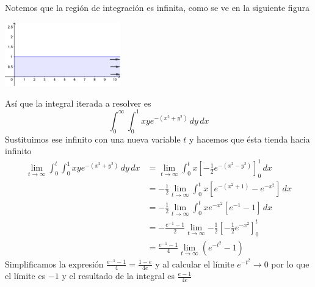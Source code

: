 \documentclass{article}
\begin{document}
\begin{enumerate}
{            \color{azul}
            Notemos que la región de integración es infinita, como se ve en la
            siguiente figura
            \begin{center}
                \includegraphics[width=5cm]{img/ej8.png}
            \end{center}
            Así que la integral iterada a resolver es
            \[
                \int_{0}^{\infty}{
                    \int_{0}^{1}{
                        xye^{-(x^2+y^2)}
                    \,dy}
                \,dx}
            \]
            Sustituimos ese infinito con una nueva variable $t$ y hacemos que
            ésta tienda hacia infinito
            \begin{align*}
                \lim_{t\to\infty}{
                    \int_{0}^{t}{
                        \int_{0}^{1}{
                            xye^{-(x^2+y^2)}
                        \,dy}
                    \,dx}
                }
                &=\lim_{t\to\infty}{
                    \int_{0}^{t}{
                        x\left[-\frac{1}{2}e^{-(x^2-y^2)}\right]_0^1
                    \,dx}
                }\\[.3cm]
                &=-\frac{1}{2}\lim_{t\to\infty}{
                    \int_{0}^{t}{
                        x\left[e^{-(x^2+1)}-e^{-x^2}\right]
                    \,dx}
                }\\[.3cm]
                &=-\frac{1}{2}\lim_{t\to\infty}{
                    \int_{0}^{t}{
                        xe^{-x^2}\left[e^{-1}-1\right]
                    \,dx}
                }\\[.3cm]
                &=-\frac{e^{-1}-1}{2}\lim_{t\to\infty}{
                    -\frac{1}{2}\left[-\frac{1}{2}e^{-x^2}\right]_{0}^{t}
                }\\[.3cm]
                &=\frac{e^{-1}-1}{4}\lim_{t\to\infty}{
                    \left(e^{-t^2}-1\right)
                }
            \end{align*}
            Simplificamos la expresión $\frac{e^{-1}-1}{4}=\frac{1-e}{4e}$ y al
            calcular el límite $e^{-t^2}\to 0$ por lo que el límite es
            $-1$ y el resultado de la integral es $\displaystyle\frac{e-1}{4e}$
        }
    \end{enumerate}
\end{document}
